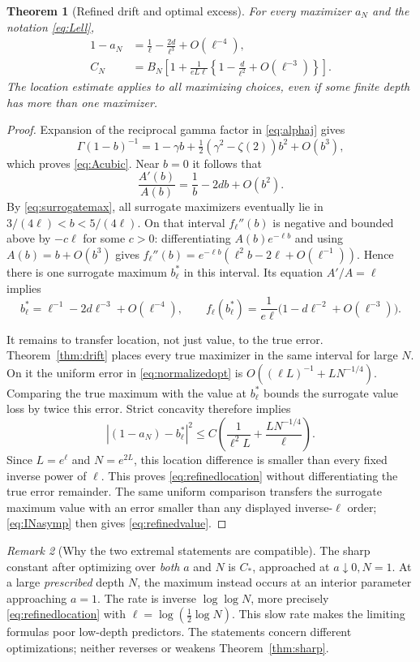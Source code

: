 \documentclass[11pt]{article}
\numberwithin{equation}{section}
\newtheorem{theorem}{Theorem}[section]
\theoremstyle{definition}\newtheorem{definition}[theorem]{Definition}
\theoremstyle{remark}\newtheorem{remark}[theorem]{Remark}
\newcommand{\Cstar}{C_*}
\begin{document}
\begin{theorem}[Refined drift and optimal excess]\label{thm:refined}
For every maximizer $a_N$ and the notation \eqref{eq:Lell},
\begin{align}
 1-a_N&=\frac1\ell-\frac{2d}{\ell^3}+O(\ell^{-4}),
 \label{eq:refinedlocation}\\
 C_N&=B_N\left[1+\frac1{eL\ell}
       \left\{1-\frac d{\ell^2}+O(\ell^{-3})\right\}\right].
 \label{eq:refinedvalue}
\end{align}
The location estimate applies to all maximizing choices, even if some
finite depth has more than one maximizer.
\end{theorem}
\begin{proof}
Expansion of the reciprocal gamma factor in \eqref{eq:alphaj} gives
\[
 \Gamma(1-b)^{-1}
 =1-\gamma b+\tfrac12(\gamma^2-\zeta(2))b^2+O(b^3),
\]
which proves \eqref{eq:Acubic}. Near $b=0$ it follows that
\[
 \frac{A'(b)}{A(b)}=\frac1b-2db+O(b^2).
\]
By \eqref{eq:surrogatemax}, all surrogate maximizers eventually lie
in $3/(4\ell)<b<5/(4\ell)$. On that interval $f_\ell''(b)$ is
negative and bounded above by $-c\ell$ for some $c>0$: differentiating
$A(b)e^{-\ell b}$ and using $A(b)=b+O(b^3)$ gives
$f_\ell''(b)=e^{-\ell b}(\ell^2b-2\ell+O(\ell^{-1}))$.
Hence there is one surrogate maximum $b_\ell^*$ in this interval.
Its equation $A'/A=\ell$ implies
\[
 b_\ell^*=\ell^{-1}-2d\ell^{-3}+O(\ell^{-4}),
 \qquad
 f_\ell(b_\ell^*)=\frac1{e\ell}
             \bigl(1-d\ell^{-2}+O(\ell^{-3})\bigr).
\]

It remains to transfer location, not just value, to the true error.
Theorem~\ref{thm:drift} places every true maximizer in the same
interval for large $N$. On it the uniform error in
\eqref{eq:normalizedopt} is
$O((\ell L)^{-1}+LN^{-1/4})$.
Comparing the true maximum with the value at $b_\ell^*$ bounds the
surrogate value loss by twice this error. Strict concavity therefore
implies
\[
 |(1-a_N)-b_\ell^*|^2
 \le C\left(\frac1{\ell^2L}+\frac{LN^{-1/4}}\ell\right).
\]
Since $L=e^\ell$ and $N=e^{2L}$, this location difference is smaller
than every fixed inverse power of $\ell$. This proves
\eqref{eq:refinedlocation} without differentiating the true error
remainder. The same uniform comparison transfers the surrogate maximum
value with an error smaller than any displayed inverse-$\ell$ order;
\eqref{eq:INasymp} then gives \eqref{eq:refinedvalue}.
\end{proof}

\begin{remark}[Why the two extremal statements are compatible]
The sharp constant after optimizing over \emph{both} $a$ and $N$ is
$\Cstar$, approached at $a\downarrow0,N=1$.
At a large \emph{prescribed} depth $N$, the maximum instead occurs at
an interior parameter approaching $a=1$. The rate is inverse
$\log\log N$, more precisely \eqref{eq:refinedlocation} with
$\ell=\log(\frac12\log N)$. This slow rate makes the limiting formulas
poor low-depth predictors. The statements concern different
optimizations; neither reverses or weakens Theorem~\ref{thm:sharp}.
\end{remark}
\end{document}
